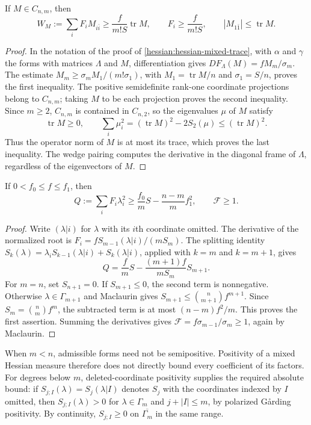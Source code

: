 \begin{lemma}\label{hessian:weighted-cone-trace}
If $M\in C_{n,m}$, then
\[
 W_M:=\sum_iF_iM_{i\bar i}\geq\frac{f}{m!S}\operatorname{tr}M,
 \qquad F_i\geq\frac{f}{m!S},\qquad
 |M_{1\bar1}|\leq\operatorname{tr}M.
\]
\end{lemma}
\begin{proof}
In the notation of the proof of \cref{hessian:hessian-mixed-trace}, with $\alpha$ and $\gamma$ the forms with matrices $\Lambda$ and $M$, differentiation gives $DF_\Lambda(M)=fM_m/\sigma_m$. The estimate $M_m\geq\sigma_m M_1/(m!\sigma_1)$, with $M_1=\operatorname{tr}M/n$ and $\sigma_1=S/n$, proves the first inequality. The positive semidefinite rank-one coordinate projections belong to $C_{n,m}$; taking $M$ to be each projection proves the second inequality.
Since $m\geq2$, $C_{n,m}$ is contained in $C_{n,2}$, so the eigenvalues $\mu$ of $M$ satisfy
\[
 \operatorname{tr}M\geq0,\qquad
 \sum_i\mu_i^2=(\operatorname{tr}M)^2-2S_2(\mu)
                   \leq(\operatorname{tr}M)^2.
\]
Thus the operator norm of $M$ is at most its trace, which proves the last inequality. The wedge pairing computes the derivative in the diagonal frame of $\Lambda$, regardless of the eigenvectors of $M$.
\end{proof}

\begin{lemma}\label{hessian:quadratic-coercivity}
If $0<f_0\leq f\leq f_1$, then
\[
 Q:=\sum_iF_i\lambda_i^2
       \geq\frac{f_0}{m}S-\frac{n-m}{m}f_1^2,
 \qquad \mathcal F\geq1.
\]
\end{lemma}
\begin{proof}
Write $(\lambda|i)$ for $\lambda$ with its $i$th coordinate omitted. The derivative of the normalized root is $F_i=fS_{m-1}(\lambda|i)/(mS_m)$. The splitting identity $S_k(\lambda)=\lambda_iS_{k-1}(\lambda|i)+S_k(\lambda|i)$, applied with $k=m$ and $k=m+1$, gives
\[
 Q=\frac f m S-\frac{(m+1)f}{mS_m}S_{m+1}.
\]
For $m=n$, set $S_{n+1}=0$. If $S_{m+1}\leq0$, the second term is nonnegative. Otherwise $\lambda\in\Gamma_{m+1}$ and Maclaurin gives $S_{m+1}\leq\binom n{m+1}f^{m+1}$. Since $S_m=\binom nm f^m$, the subtracted term is at most $(n-m)f^2/m$. This proves the first assertion. Summing the derivatives gives $\mathcal F=f\sigma_{m-1}/\sigma_m\geq1$, again by Maclaurin.
\end{proof}

When $m<n$, admissible forms need not be semipositive. Positivity of a
mixed Hessian measure therefore does not directly bound every coefficient
of its factors. For degrees below $m$, deleted-coordinate positivity
supplies the required absolute bound: if $S_{j;I}(\lambda)=S_j(\lambda|I)$
denotes $S_j$ with the coordinates indexed by $I$ omitted, then
$S_{j;I}(\lambda)>0$ for $\lambda\in\Gamma_m$ and $j+|I|\leq m$, by
polarized G\aa rding positivity. By continuity, $S_{j;I}\geq0$ on
$\overline{\Gamma_m}$ in the same range.

